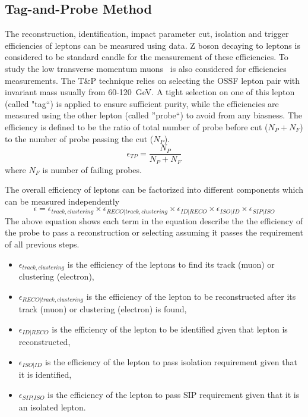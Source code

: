 \subsection{Tag-and-Probe Method}
 The reconstruction, identification, impact parameter cut, isolation and trigger efficiencies of leptons can be measured using data. Z boson  decaying to 
 leptons is considered to be standard candle for the measurement of these efficiencies. To study the low transverse momentum muons \jpsi~is also considered 
 for efficiencies measurements. The T\&P technique relies on selecting the  OSSF lepton pair with invariant mass usually from 60-120~GeV. A tight selection
 on one of this lepton (called "tag``) is applied to ensure sufficient purity, while the efficiencies are measured using the other lepton (called ''probe``)
 to avoid from any biasness. The efficiency is defined to be the ratio of total number of probe before cut ($N_P + N_F $) to the number of  probe passing 
 the cut ($N_P$).
 \begin{equation}
  \epsilon_{TP} = \frac{N_P}{N_P+N_F}
 \end{equation}
where $N_F$ is number of failing probes.
\par The  overall efficiency of leptons can be factorized into different components which can be measured independently
\begin{equation}
\label{eq:leptons_efficiency_factorization}
 \epsilon =  \epsilon_{track, clustering}\times \epsilon_{RECO|track,clustering} \times \epsilon_{ID|RECO}\times \epsilon_{ISO|ID}\times \epsilon_{SIP|ISO} 
\end{equation}
The above equation shows each term in the equation describe the the efficiency of the probe to pass a reconstruction or selecting assuming it passes
the requirement of all previous steps. 
\begin{itemize}
 \item $\epsilon_{track, clustering}$ is the efficiency of the leptons to find its track (muon) or clustering (electron),
 \item $\epsilon_{RECO|track,clustering}$ is the efficiency of the lepton to be reconstructed after its track (muon) or clustering (electron) is found,
 \item $\epsilon_{ID|RECO}$ is the efficiency of the lepton to be identified given that lepton is reconstructed,
 \item $\epsilon_{ISO|ID}$  is the efficiency of the lepton to  pass isolation requirement given that it is identified,
 \item $\epsilon_{SIP|ISO}$ is the efficiency of the lepton to pass SIP requirement given that it is an isolated lepton.
\end{itemize}
